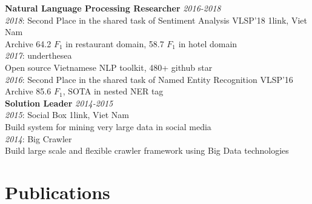 \documentclass[11pt,a4paper,roman]{article}
\begin{document}

\noindent
\textbf{Natural Language Processing Researcher}
\hfill
\textit{2016-2018}
\\
\textit{2018}: Second Place in the shared task of Sentiment Analysis VLSP'18
\hfill
1link, Viet Nam
\\
Archive 64.2 $F_{1}$ in restaurant domain, 58.7 $F_{1}$ in hotel domain
\\
\textit{2017}: underthesea
\\\noindent
Open source Vietnamese NLP toolkit, 480+ github star
\\
\textit{2016}: Second Place in the shared task of Named Entity Recognition VLSP'16
\\
Archive 85.6 $F_{1}$, SOTA in nested NER tag
\\

\noindent\textbf{Solution Leader}
\hfill
\textit{2014-2015} \\
\textit{2015}: Social Box
\hfill
1link, Viet Nam
\\
Build system for mining very large data in social media
\\
\textit{2014}: Big Crawler\\
Build large scale and flexible crawler framework using Big Data technologies


\section{Publications}
\end{document}
